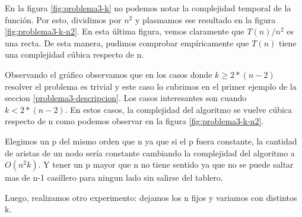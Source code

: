 En la figura \ref{fig:problema3-k} no podemos notar la complejidad temporal de la función. Por esto, dividimos por $n^2$ y plasmamos ese resultado en la figura \ref{fig:problema3-k-n2}. En esta última figura, vemos claramente que $T(n) / n ^ 2$ es una recta. De esta manera, pudimos comprobar empíricamente que $T(n)$ tiene una complejidad cúbica respecto de n.

Observando el gráfico observamos que en los casos donde $k \geq 2*(n-2)$ resolver el problema es trivial y este caso lo cubrimos en el primer ejemplo de la seccion \ref{problema3-descripcion}. Los casos interesantes son cuando $k < 2*(n-2)$. En estos casos, la complejidad del algoritmo se vuelve cúbica respecto de n como podemos observar en la figura \ref{fig:problema3-k-n2}.

Elegimos un p del mismo orden que n ya que si el p fuera constante, la cantidad de aristas de un nodo sería constante cambiando la complejidad del algoritmo a $O(n^2k)$. Y tener un p mayor que n no tiene sentido ya que no se puede saltar mas de n-1 casillero para ningun lado sin salirse del tablero.

Luego, realizamos otro experimento: dejamos los n fijos y variamos con distintos k.


